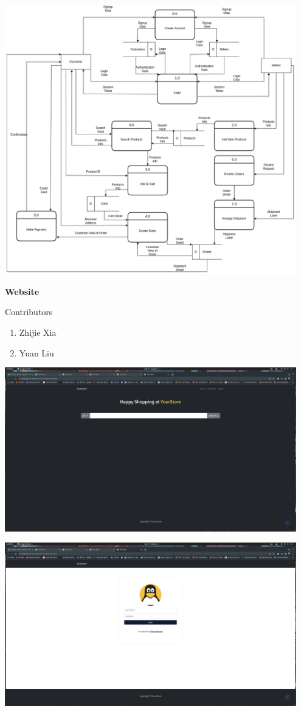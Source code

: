 \documentclass[12pt]{article}
\begin{document}
\includegraphics[width=0.95\textwidth]{DFD/DFD.drawio.png}



\newpage
\textbf{Website}

Contributors
\begin{enumerate}
    \item Zhijie Xia
    \item Yuan Liu
\end{enumerate}


\includegraphics[width=0.95\textwidth]{Screenshots/home_index.png}

\includegraphics[width=0.95\textwidth]{Screenshots/login.png}
\end{document}
